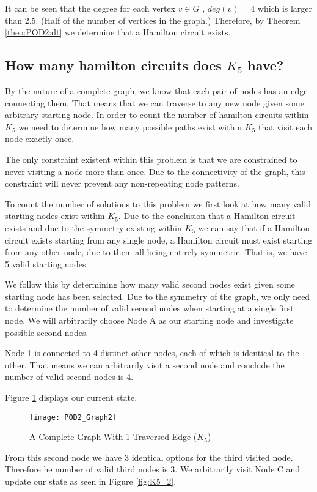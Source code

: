It can be seen that the degree for each vertex $v \in G$ , $deg(v)=4$ which is larger than 2.5. (Half of the number of vertices in the graph.) Therefore, by Theorem \ref{theo:POD2:dt} we determine that a Hamilton circuit exists.

\subsection{How many hamilton circuits does $K_5$ have?}
By the nature of a complete graph, we know that each pair of nodes has an edge connecting them. That means that we can traverse to any new node given some arbitrary starting node. In order to count the number of hamilton circuits within $K_5$ we need to determine how many possible paths exist within $K_5$ that visit each node exactly once.

The only constraint existent within this problem is that we are constrained to never visiting a node more than once. Due to the connectivity of the graph, this constraint will never prevent any non-repeating node patterns.

To count the number of solutions to this problem we first look at how many valid starting nodes exist within $K_5$. Due to the conclusion that a Hamilton circuit exists and due to the symmetry existing within $K_5$ we can say that if a Hamilton circuit exists starting from any single node, a Hamilton circuit must exist starting from any other node, due to them all being entirely symmetric. That is, we have 5 valid starting nodes.

We follow this by determining how many valid second nodes exist given some starting node has been selected. Due to the symmetry of the graph, we only need to determine the number of valid second nodes when starting at a single first node. We will arbitrarily choose Node A as our starting node and investigate possible second nodes.

Node 1 is connected to 4 distinct other nodes, each of which is identical to the other. That means we can arbitrarily visit a second node and conclude the number of valid second nodes is 4.

Figure \ref{fig:K5_1} displays our current state.

\begin{figure}[ht]
\centering
\texttt{[image: POD2\_Graph2]}
\caption{A Complete Graph With 1 Traversed Edge ($K_5$)}
\label{fig:K5_1}
\end{figure}

\newpage
From this second node we have 3 identical options for the third visited node. Therefore he number of valid third nodes is 3. We arbitrarily visit Node C and update our state as seen in Figure \ref{fig:K5_2}.

